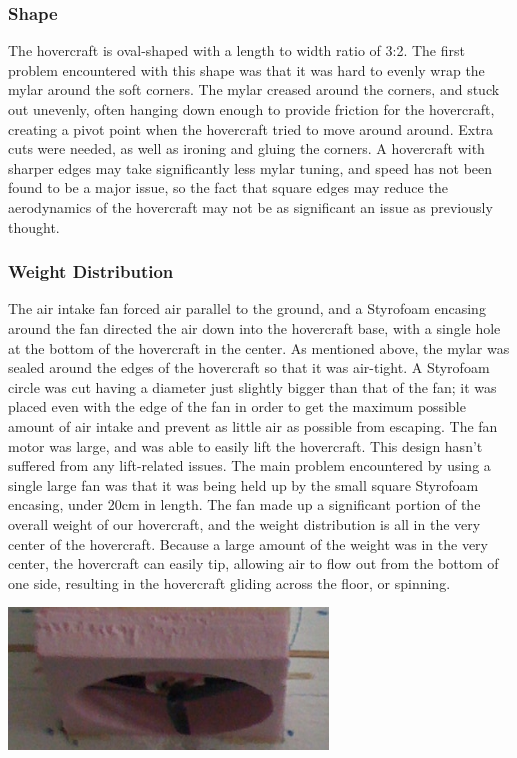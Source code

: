 \subsubsection{Shape}
The hovercraft is oval-shaped with a length to width ratio of 3:2. The first problem encountered with this shape was that it was hard to evenly wrap the mylar around the soft corners. The mylar creased around the corners, and stuck out unevenly, often hanging down enough to provide friction for the hovercraft, creating a pivot point when the hovercraft tried to move around around.  Extra cuts were needed, as well as ironing and gluing the corners.  A hovercraft with sharper edges may take significantly less mylar tuning, and speed has not been found to be a major issue, so the fact that square edges may reduce the aerodynamics of the hovercraft may not be as significant an issue as previously thought.

\subsubsection{Weight Distribution}
The air intake fan forced air parallel to the ground, and a Styrofoam encasing around the fan directed the air down into the hovercraft base, with a single hole at the bottom of the hovercraft in the center. As mentioned above, the mylar was sealed around the edges of the hovercraft so that it was air-tight. A Styrofoam circle was cut having a diameter just slightly bigger than that of the fan; it was placed even with the edge of the fan in order to get the maximum possible amount of air intake and prevent as little air as possible from escaping.  The fan motor was large, and was able to easily lift the hovercraft.  This design hasn't suffered from any lift-related issues. The main problem encountered by using a single large fan was that it was being held up by the small square Styrofoam encasing, under 20cm in length. The fan made up a significant portion of the overall weight of our hovercraft, and the weight distribution is all in the very center of the hovercraft. Because a large amount of the weight was in the very center, the hovercraft can easily tip, allowing air to flow out from the bottom of one side, resulting in the hovercraft gliding across the floor, or spinning.

\begin{center}
  \includegraphics[width=85mm]{imageSources/weightDistro1.png}
\end{center}
\label{weightDistro1}

